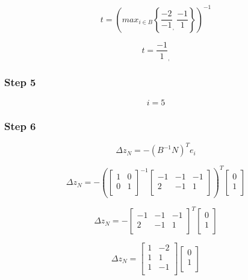\documentclass[14pt]{extarticle}
\begin{document}
\[
    t = \left(max_{i \in B} \left\{ \frac{-2}{-1} _{\textstyle,}\ \frac{-1}{1} \right\} \right)^{-1}
\]

\[
    t = \frac{-1}{1}_{\textstyle,}
\]

\subsubsection*{Step 5}
\[
    i = 5
\]

\subsubsection*{Step 6}
\[
    \Delta z_N = -\left(B^{-1}N\right)^T e_i
\]

\[
    \Delta z_N = -\left(
    \begin{bmatrix}
        1 & 0 \\
        0 & 1 \\
    \end{bmatrix}^{-1}
    \begin{bmatrix}
        -1 & -1 & -1 \\
        2 & -1 & 1 \\
    \end{bmatrix}\right)^T
    \begin{bmatrix}
        0 \\
        1 \\
    \end{bmatrix}
\]

\[
    \Delta z_N =
    -\begin{bmatrix}
        -1 & -1 & -1 \\
        2 & -1 & 1 \\
    \end{bmatrix}^T
    \begin{bmatrix}
        0 \\
        1 \\
    \end{bmatrix}
\]

\[
    \Delta z_N =
    \begin{bmatrix}
        1 & -2 \\
        1 & 1 \\
        1 & -1 \\
    \end{bmatrix}
    \begin{bmatrix}
        0 \\
        1 \\
    \end{bmatrix}
\]
\end{document}
